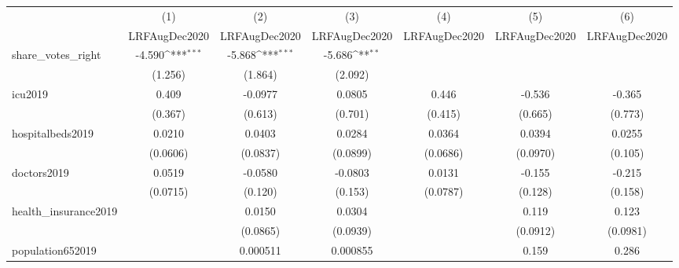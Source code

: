 {
\def\sym#1{\ifmmode^{#1}\else\(^{#1}\)\fi}
\begin{tabular}{l*{6}{c}}
\hline\hline
            &\multicolumn{1}{c}{(1)}&\multicolumn{1}{c}{(2)}&\multicolumn{1}{c}{(3)}&\multicolumn{1}{c}{(4)}&\multicolumn{1}{c}{(5)}&\multicolumn{1}{c}{(6)}\\
            &\multicolumn{1}{c}{LRFAugDec2020}&\multicolumn{1}{c}{LRFAugDec2020}&\multicolumn{1}{c}{LRFAugDec2020}&\multicolumn{1}{c}{LRFAugDec2020}&\multicolumn{1}{c}{LRFAugDec2020}&\multicolumn{1}{c}{LRFAugDec2020}\\
\hline
share\_votes\_right&      -4.590\sym{***}&      -5.868\sym{***}&      -5.686\sym{**} &                     &                     &                     \\
            &     (1.256)         &     (1.864)         &     (2.092)         &                     &                     &                     \\
[1em]
icu2019     &       0.409         &     -0.0977         &      0.0805         &       0.446         &      -0.536         &      -0.365         \\
            &     (0.367)         &     (0.613)         &     (0.701)         &     (0.415)         &     (0.665)         &     (0.773)         \\
[1em]
hospitalbeds2019&      0.0210         &      0.0403         &      0.0284         &      0.0364         &      0.0394         &      0.0255         \\
            &    (0.0606)         &    (0.0837)         &    (0.0899)         &    (0.0686)         &    (0.0970)         &     (0.105)         \\
[1em]
doctors2019 &      0.0519         &     -0.0580         &     -0.0803         &      0.0131         &      -0.155         &      -0.215         \\
            &    (0.0715)         &     (0.120)         &     (0.153)         &    (0.0787)         &     (0.128)         &     (0.158)         \\
[1em]
health\_insurance2019&                     &      0.0150         &      0.0304         &                     &       0.119         &       0.123         \\
            &                     &    (0.0865)         &    (0.0939)         &                     &    (0.0912)         &    (0.0981)         \\
[1em]
population652019&                     &    0.000511         &    0.000855         &                     &       0.159         &       0.286         \\

\end{tabular}}
